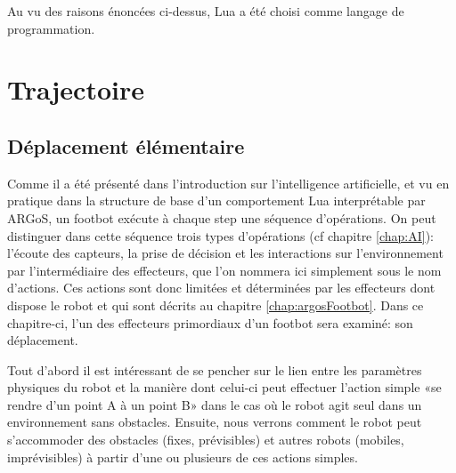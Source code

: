 \documentclass[a4paper,11pt]{report}
\begin{document}
Au vu des raisons énoncées ci-dessus, Lua a été choisi comme langage de programmation. 

\chapter{Trajectoire}

\section{Déplacement élémentaire}

Comme il a été présenté dans l'introduction sur l'intelligence artificielle, et vu en pratique dans la structure de base d'un comportement Lua interprétable par ARGoS, un footbot exécute à chaque step une séquence d'opérations. On peut distinguer dans cette séquence trois types d'opérations (cf chapitre \ref{chap:AI}): l'écoute des capteurs, la prise de décision et les interactions sur l'environnement par l'intermédiaire des effecteurs, que l'on nommera ici simplement sous le nom d'actions. Ces actions sont donc limitées et déterminées par les effecteurs dont dispose le robot et qui sont décrits au chapitre \ref{chap:argosFootbot}. Dans ce chapitre-ci, l'un des effecteurs primordiaux d'un footbot sera examiné: son déplacement.

Tout d'abord il est intéressant de se pencher sur le lien entre les paramètres physiques du robot et la manière dont celui-ci peut effectuer l'action simple «se rendre d'un point A à un point B» dans le cas où le robot agit seul dans un environnement sans obstacles. Ensuite, nous verrons comment le robot peut s’accommoder des obstacles (fixes, prévisibles) et autres robots (mobiles, imprévisibles) à partir d'une ou plusieurs de ces actions simples.
\end{document}
